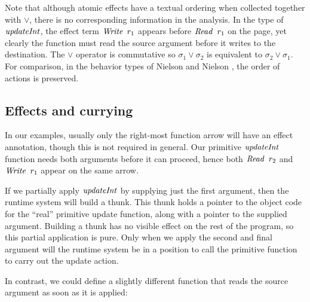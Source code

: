 Note that although atomic effects have a textual ordering when collected together with $\lor$, there is no corresponding information in the analysis. In the type of $\operatorname{\mathit{updateInt}}$, the effect term $\operatorname{\mathit{Write}} \ r_1$ appears before $\operatorname{\mathit{Read}} \ r_1$ on the page, yet clearly the function must read the source argument before it writes to the destination. The $\lor$ operator is commutative so $\sigma_1 \lor \sigma_2$ is equivalent to $\sigma_2 \lor \sigma_1$. 
For comparison, in the behavior types of Nielson and Nielson \cite{nielson:from-cml-to-its-process-algebra, nielson:type-and-effect-systems}, the order of actions is preserved.


\subsection{Effects and currying}
\label{System:Effects:currying}
In our examples, usually only the right-most function arrow will have an effect annotation, though this is not required in general. Our primitive $\operatorname{\mathit{updateInt}}$ function needs both arguments before it can proceed, hence both $\operatorname{\mathit{Read}} \ r_2$ and $\operatorname{\mathit{Write}} \ r_1$ appear on the same arrow.

If we partially apply $\operatorname{\mathit{updateInt}}$ by supplying just the first argument, then the runtime system will build a thunk. This thunk holds a pointer to the object code for the ``real'' primitive update function, along with a pointer to the supplied argument. Building a thunk has no visible effect on the rest of the program, so this partial application is pure. Only when we apply the second and final argument will the runtime system be in a position to call the primitive function to carry out the update action.

In contrast, we could define a slightly different function that reads the source argument as soon as it is applied:
\medskip



